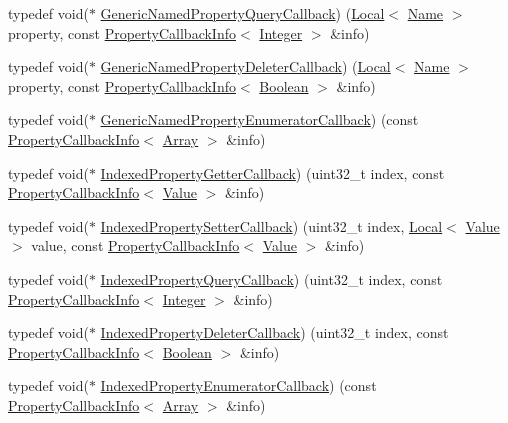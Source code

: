 \begin{DoxyCompactItemize}
\item 
typedef void($\ast$ \hyperlink{namespacev8_add9f7ab11e4a9a2b9ad2c4536b0e1a64}{Generic\+Named\+Property\+Query\+Callback}) (\hyperlink{classv8_1_1_local}{Local}$<$ \hyperlink{classv8_1_1_name}{Name} $>$ property, const \hyperlink{classv8_1_1_property_callback_info}{Property\+Callback\+Info}$<$ \hyperlink{classv8_1_1_integer}{Integer} $>$ \&info)
\item 
typedef void($\ast$ \hyperlink{namespacev8_ad2aecc0406ea4bc02d5a4f84a433b273}{Generic\+Named\+Property\+Deleter\+Callback}) (\hyperlink{classv8_1_1_local}{Local}$<$ \hyperlink{classv8_1_1_name}{Name} $>$ property, const \hyperlink{classv8_1_1_property_callback_info}{Property\+Callback\+Info}$<$ \hyperlink{classv8_1_1_boolean}{Boolean} $>$ \&info)
\item 
typedef void($\ast$ \hyperlink{namespacev8_a20826eb7e52e84fa4f632534e8eddd04}{Generic\+Named\+Property\+Enumerator\+Callback}) (const \hyperlink{classv8_1_1_property_callback_info}{Property\+Callback\+Info}$<$ \hyperlink{classv8_1_1_array}{Array} $>$ \&info)
\item 
typedef void($\ast$ \hyperlink{namespacev8_a48e7816ba64447bf32a25d194588daaf}{Indexed\+Property\+Getter\+Callback}) (uint32\+\_\+t index, const \hyperlink{classv8_1_1_property_callback_info}{Property\+Callback\+Info}$<$ \hyperlink{classv8_1_1_value}{Value} $>$ \&info)
\item 
typedef void($\ast$ \hyperlink{namespacev8_a4ac7cc6185ebc8b6a199f9fa8e6bf5c3}{Indexed\+Property\+Setter\+Callback}) (uint32\+\_\+t index, \hyperlink{classv8_1_1_local}{Local}$<$ \hyperlink{classv8_1_1_value}{Value} $>$ value, const \hyperlink{classv8_1_1_property_callback_info}{Property\+Callback\+Info}$<$ \hyperlink{classv8_1_1_value}{Value} $>$ \&info)
\item 
typedef void($\ast$ \hyperlink{namespacev8_a980b62c33eb664783e61e25c3b27f9ee}{Indexed\+Property\+Query\+Callback}) (uint32\+\_\+t index, const \hyperlink{classv8_1_1_property_callback_info}{Property\+Callback\+Info}$<$ \hyperlink{classv8_1_1_integer}{Integer} $>$ \&info)
\item 
typedef void($\ast$ \hyperlink{namespacev8_a53863728de14cde48dd6543207b2f2da}{Indexed\+Property\+Deleter\+Callback}) (uint32\+\_\+t index, const \hyperlink{classv8_1_1_property_callback_info}{Property\+Callback\+Info}$<$ \hyperlink{classv8_1_1_boolean}{Boolean} $>$ \&info)
\item 
typedef void($\ast$ \hyperlink{namespacev8_adbb0a6d5537371953f9ba807d4f6275e}{Indexed\+Property\+Enumerator\+Callback}) (const \hyperlink{classv8_1_1_property_callback_info}{Property\+Callback\+Info}$<$ \hyperlink{classv8_1_1_array}{Array} $>$ \&info)

\end{DoxyCompactItemize}
